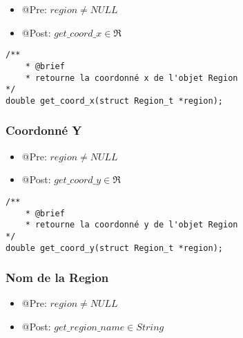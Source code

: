 \begin{itemize}
    \item @Pre: $region \ne NULL$
    \item @Post: $get\_coord\_x \in \Re$ 
\end{itemize}

\begin{lstlisting}
/**
    * @brief 
    * retourne la coordonné x de l'objet Region
*/
double get_coord_x(struct Region_t *region);
\end{lstlisting}




\subsubsection{Coordonné Y}

\begin{itemize}
    \item @Pre: $region \ne NULL$
    \item @Post: $get\_coord\_y \in \Re$ 
\end{itemize}

\begin{lstlisting}
/**
    * @brief 
    * retourne la coordonné y de l'objet Region
*/
double get_coord_y(struct Region_t *region);
\end{lstlisting}


\subsubsection{Nom de la Region}

\begin{itemize}
    \item @Pre: $region \ne NULL$
    \item @Post: $get\_region\_name \in String$ 
\end{itemize}


